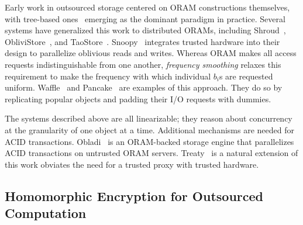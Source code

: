\documentclass[11pt]{article}
\begin{document}
Early work in outsourced storage centered on ORAM constructions themselves, with tree-based ones~\cite{stefanov2013pathoram, ren2015constants} emerging as the dominant paradigm in practice.  Several systems have generalized this work to distributed ORAMs, including Shroud~\cite{lorch2013shroud}, ObliviStore~\cite{stefanov2013oblivistore}, and TaoStore~\cite{sahin2016taostore}.  Snoopy~\cite{dauterman2021snoopy} integrates trusted hardware into their design to parallelize oblivious reads and writes.   Whereas ORAM makes all access requests indistinguishable from one another,  {\em frequency smoothing} relaxes this requirement to make the frequency with which individual $b_i$s are requested uniform.  Waffle~\cite{maiyya2023waffle} and Pancake~\cite{grubbs2020pancake} are examples of this approach. They do so by replicating popular objects and padding their I/O requests with dummies. 


The systems described above are all linearizable; they reason about concurrency at the granularity of one object at a time.  Additional mechanisms are needed for ACID transactions.   Obladi~\cite{crooks2018obladi} is an ORAM-backed storage engine that parallelizes ACID transactions on untrusted ORAM servers.  Treaty~\cite{giantsidi2022treaty} is a natural extension of this work obviates the need for a trusted proxy with trusted hardware.


\subsection{Homomorphic Encryption for Outsourced Computation}
\label{sec:he}
\end{document}
